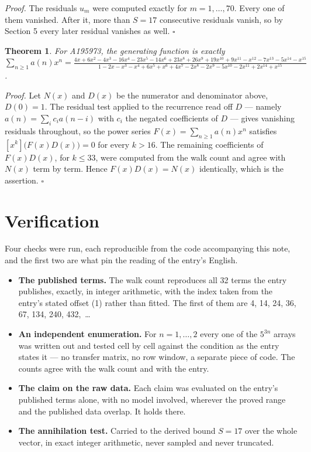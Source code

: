 \documentclass[11pt]{article}
\newtheorem{theorem}{Theorem}
\theoremstyle{definition}
\begin{document}
{\itshape Proof.} The residuals $u_m$ were computed exactly for $m = 1,\dots,70$. Every one of them vanished. After it, more than $S = 17$ consecutive residuals vanish, so by Section 5 every later residual vanishes as well. $\square$

\begin{theorem} For A195973, the generating function is exactly $\sum_{n\ge 1} a(n)x^n = \frac{4x + 6x^{2} - 4x^{3} - 16x^{4} - 23x^{5} - 14x^{6} + 23x^{8} + 26x^{9} + 19x^{10} + 9x^{11} - x^{12} - 7x^{13} - 5x^{14} - x^{15}}{1 - 2x - x^{3} - x^{4} + 6x^{5} + x^{6} + 4x^{7} - 2x^{8} - 2x^{9} - 5x^{10} - 2x^{11} + 2x^{14} + x^{15}}$.\end{theorem}

{\itshape Proof.} Let $N(x)$ and $D(x)$ be the numerator and denominator above, $D(0)=1$. The residual test applied to the recurrence read off $D$ --- namely $a(n) = \sum_i c_i a(n-i)$ with $c_i$ the negated coefficients of $D$ --- gives vanishing residuals throughout, so the power series $F(x)=\sum_{n\ge 1}a(n)x^n$ satisfies $[x^k]\bigl(F(x)D(x)\bigr) = 0$ for every $k > 16$. The remaining coefficients of $F(x)D(x)$, for $k \le 33$, were computed from the walk count and agree with $N(x)$ term by term. Hence $F(x)D(x) = N(x)$ identically, which is the assertion. $\square$

\section{Verification}

Four checks were run, each reproducible from the code accompanying this note, and the first two are what pin the reading of the entry's English.

\begin{itemize}

\item {\bfseries The published terms.} The walk count reproduces all 32 terms the entry publishes, exactly, in integer arithmetic, with the index taken from the entry's stated offset (1) rather than fitted. The first of them are 4, 14, 24, 36, 67, 134, 240, 432,~\dots

\item {\bfseries An independent enumeration.} For $n = 1,\dots,2$ every one of the $5^{3n}$ arrays was written out and tested cell by cell against the condition as the entry states it --- no transfer matrix, no row window, a separate piece of code. The counts agree with the walk count and with the entry.

\item {\bfseries The claim on the raw data.} Each claim was evaluated on the entry's published terms alone, with no model involved, wherever the proved range and the published data overlap. It holds there.

\item {\bfseries The annihilation test.} Carried to the derived bound $S = 17$ over the whole vector, in exact integer arithmetic, never sampled and never truncated.

\end{itemize}
\end{document}

